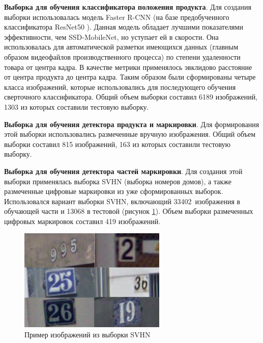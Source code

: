 \textbf{Выборка для обучения классификатора положения продукта}. Для создания выборки использовалась модель Faster R-CNN \cite[c.~3]{ren} (на базе  предобученного классификатора ResNet50 \cite[c.~6]{he}). Данная модель обладает лучшими показателями эффективности, чем SSD-MobileNet, но уступает ей в скорости. Она использовалась для автоматической разметки имеющихся данных (главным образом видеофайлов производственного процесса) по степени удаленности товара от центра кадра. В качестве метрики применялось эвклидово расстояние от центра продукта до центра кадра. Таким образом были сформированы четыре класса изображений, которые использовались для последующего обучения сверточного классификатора. Общий объем выборки составил 6189 изображений, 1303 из которых составили тестовую выборку.

\textbf{Выборка для обучения детектора продукта и маркировки}. Для формирования этой выборки использовались размеченные вручную изображения. Общий объем выборки составил 815 изображений, 163 из которых составили тестовую выборку.


\textbf{Выборка для обучения детектора частей маркировки}. Для создания этой выборки применялась выборка SVHN \cite[c.~3]{netzer} (выборка номеров домов), а также размеченные цифровые маркировки из уже сформированных выборок. Использовался вариант выборки SVHN, включающий 33402~изображения в обучающей части и 13068 в тестовой (рисунок \ref{fig:svhn_dataset}). Объем выборки размеченных цифровых маркировок составил 419 изображений.

\begin{figure}[ht]
	\centering
	\includegraphics[width=7cm]{man-source/images/ch4/pic4-14.png}
	\caption{Пример изображений из выборки SVHN}
	\label{fig:svhn_dataset}
\end{figure}

